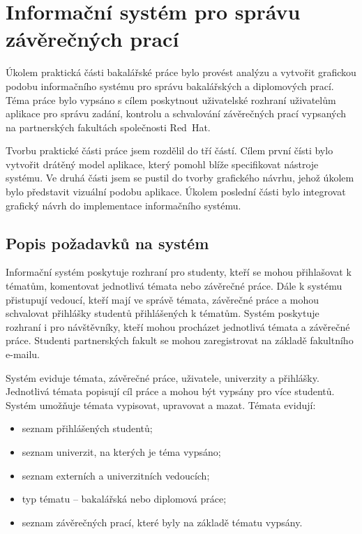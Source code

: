 \chapter{Informační systém pro správu závěrečných prací}

Úkolem praktická části bakalářské práce bylo provést analýzu a vytvořit grafickou podobu informačního systému pro správu bakalářských a diplomových prací. Téma práce bylo vypsáno s cílem poskytnout uživatelské rozhraní uživatelům aplikace pro správu zadání, kontrolu a schvalování závěrečných prací vypsaných na partnerských fakultách společnosti Red~Hat.

Tvorbu praktické části práce jsem rozdělil do tří částí. Cílem první čísti bylo vytvořit drátěný model aplikace, který pomohl blíže specifikovat nástroje systému. Ve druhá části jsem se pustil do tvorby grafického návrhu, jehož úkolem bylo představit vizuální podobu aplikace. Úkolem poslední části bylo integrovat grafický návrh do implementace informačního systému.

\section{Popis požadavků na systém}

Informační systém poskytuje rozhraní pro studenty, kteří se mohou přihlašovat k tématům, komentovat jednotlivá témata nebo závěrečné práce. Dále k systému přistupují vedoucí, kteří mají ve správě témata, závěrečné práce a mohou schvalovat přihlášky studentů přihlášených k tématům. Systém poskytuje rozhraní i pro návštěvníky, kteří mohou procházet jednotlivá témata a závěrečné práce. Studenti partnerských fakult se mohou zaregistrovat na základě fakultního e-mailu.

Systém eviduje témata, závěrečné práce, uživatele, univerzity a přihlášky. Jednotlivá témata popisují cíl práce a mohou být vypsány pro více studentů. Systém umožňuje témata vypisovat, upravovat a mazat. Témata evidují:

\begin{itemize}
    \item seznam přihlášených studentů;
    \item seznam univerzit, na kterých je téma vypsáno;
    \item seznam externích a univerzitních vedoucích;
    \item typ tématu -- bakalářská nebo diplomová práce;
    \item seznam závěrečných prací, které byly na základě tématu vypsány.
\end{itemize}


